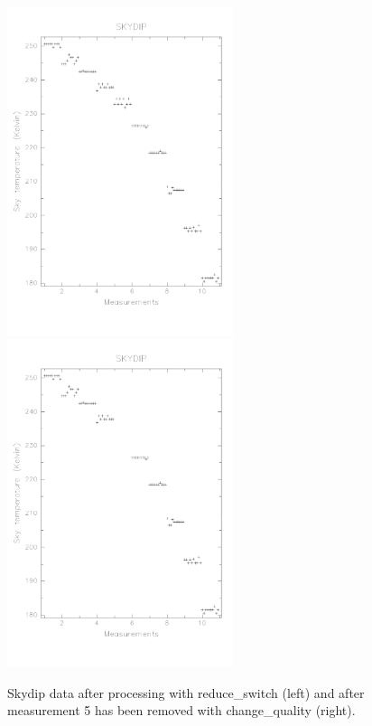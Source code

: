 \documentclass[twoside,11pt]{starlink}
\providecommand{\task}[1]{#1}
\begin{document}
\begin{enumerate}
\begin{figure}
\begin{center}
\includegraphics[width=2.6in]{sun216_rawsdip}
\includegraphics[width=2.6in]{sun216_rawsdip2}
\caption{Skydip data after processing with \task{reduce\_switch} (left) and after measurement
5 has been removed with \task{change\_quality} (right).}
\label{rawsdip}
\end{center}
\end{figure}




\end{enumerate}
\end{document}
